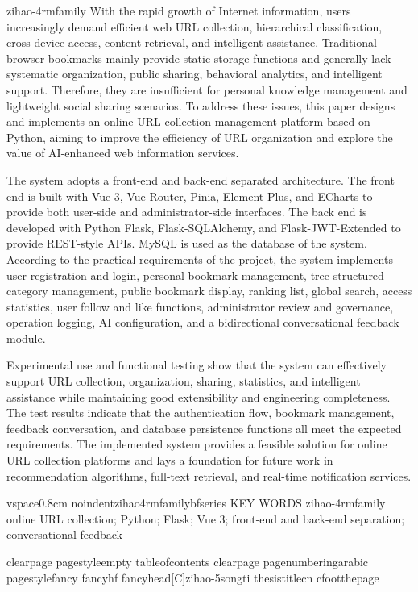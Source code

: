 {zihao{-4}rmfamily
With the rapid growth of Internet information, users increasingly demand efficient web URL collection, hierarchical classification, cross-device access, content retrieval, and intelligent assistance. Traditional browser bookmarks mainly provide static storage functions and generally lack systematic organization, public sharing, behavioral analytics, and intelligent support. Therefore, they are insufficient for personal knowledge management and lightweight social sharing scenarios. To address these issues, this paper designs and implements an online URL collection management platform based on Python, aiming to improve the efficiency of URL organization and explore the value of AI-enhanced web information services.

The system adopts a front-end and back-end separated architecture. The front end is built with Vue 3, Vue Router, Pinia, Element Plus, and ECharts to provide both user-side and administrator-side interfaces. The back end is developed with Python Flask, Flask-SQLAlchemy, and Flask-JWT-Extended to provide REST-style APIs. MySQL is used as the database of the system. According to the practical requirements of the project, the system implements user registration and login, personal bookmark management, tree-structured category management, public bookmark display, ranking list, global search, access statistics, user follow and like functions, administrator review and governance, operation logging, AI configuration, and a bidirectional conversational feedback module.

Experimental use and functional testing show that the system can effectively support URL collection, organization, sharing, statistics, and intelligent assistance while maintaining good extensibility and engineering completeness. The test results indicate that the authentication flow, bookmark management, feedback conversation, and database persistence functions all meet the expected requirements. The implemented system provides a feasible solution for online URL collection platforms and lays a foundation for future work in recommendation algorithms, full-text retrieval, and real-time notification services.

vspace{0.8cm}
noindent{zihao{4}rmfamilybfseries KEY WORDS }{zihao{-4}rmfamily online URL collection; Python; Flask; Vue 3; front-end and back-end separation; conversational feedback}
}

clearpage
pagestyle{empty}
tableofcontents
clearpage
pagenumbering{arabic}
pagestyle{fancy}
fancyhf{}
fancyhead[C]{zihao{-5}songti thesistitlecn}
cfoot{thepage}

